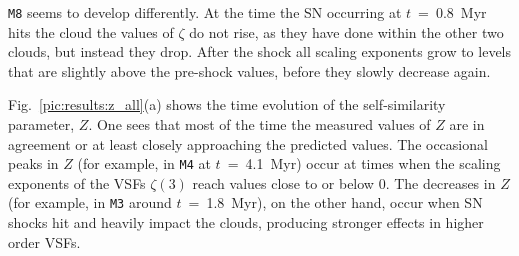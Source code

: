 \texttt{M8} seems to develop differently.
At the time the SN occurring at $t$~=~0.8~Myr hits the cloud the values of $\zeta$ do not rise, as they have done within the other two clouds, but instead they drop. 
After the shock all scaling exponents grow to levels that are slightly above the pre-shock values, before they slowly decrease again.

Fig.~\ref{pic:results:z_all}(a) shows the time evolution of the self-similarity parameter, $Z$. 
One sees that most of the time the measured values of $Z$ are in agreement or at least closely approaching the predicted values. 
   The occasional peaks in 
$Z$ (for example, in \texttt{M4} at $t$~=~4.1~Myr) occur at times when the scaling exponents of the VSFs $\zeta(3)$ reach values close to or below 0.
The decreases in $Z$ (for example, in \texttt{M3} around $t$~=~1.8~Myr), on the other hand, occur when SN shocks hit and heavily impact the clouds, 
     producing stronger effects in higher order VSFs.

